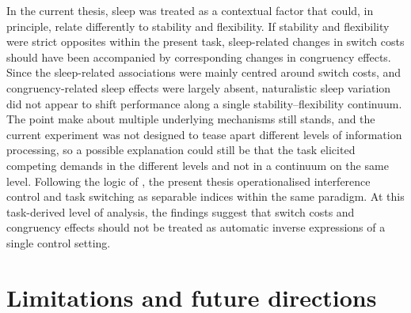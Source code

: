 \documentclass[12pt,a4paper]{report}
\begin{document}
In the current thesis, sleep was treated as a contextual factor that could, in principle, relate differently to stability and flexibility. If stability and flexibility were strict opposites within the present task, sleep-related changes in switch costs should have been accompanied by corresponding changes in congruency effects. Since the sleep-related associations were mainly centred around switch costs, and congruency-related sleep effects were largely absent, naturalistic sleep variation did not appear to shift performance along a single stability--flexibility continuum. The point \textcite{dreisbach2024dependent} make about multiple underlying mechanisms still stands, and the current experiment was not designed to tease apart different levels of information processing, so a possible explanation could still be that the task elicited competing demands in the different levels and not in a continuum on the same level. Following the logic of \textcite{egner2024reply}, the present thesis operationalised interference control and task switching as separable indices within the same paradigm. At this task-derived level of analysis, the findings suggest that switch costs and congruency effects should not be treated as automatic inverse expressions of a single control setting.



\section{Limitations and future directions}
\end{document}
